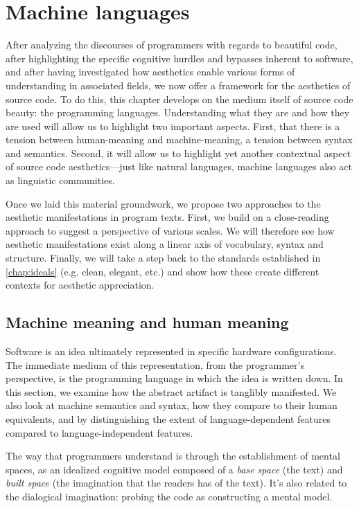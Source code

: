 \chapter{Machine languages}
\label{chap:programming}

After analyzing the discourses of programmers with regards to beautiful code, after highlighting the specific cognitive hurdles and bypasses inherent to software, and after having investigated how aesthetics enable various forms of understanding in associated fields, we now offer a framework for the aesthetics of source code. To do this, this chapter develops on the medium itself of source code beauty: the programming languages. Understanding what they are and how they are used will allow us to highlight two important aspects. First, that there is a tension between human-meaning and machine-meaning, a tension between syntax and semantics. Second, it will allow us to highlight yet another contextual aspect of source code aesthetics—just like natural languages, machine languages also act as linguistic communities.

Once we laid this material groundwork, we propose two approaches to the aesthetic manifestations in program texts. First, we build on a close-reading approach to suggest a perspective of various scales. We will therefore see how aesthetic manifestations exist along a linear axis of vocabulary, syntax and structure. Finally, we will take a step back to the standards established in \ref{chap:ideals} (e.g. clean, elegant, etc.) and show how these create different contexts for aesthetic appreciation.

\section{Machine meaning and human meaning}
\label{sec:human-machine-meaning}

Software is an idea ultimately represented in specific hardware configurations. The immediate medium of this representation, from the programmer's perspective, is the programming language in which the idea is written down. In this section, we examine how the abstract artifact is tanglibly manifested. We also look at machine semantics and syntax, how they compare to their human equivalents, and by distinguishing the extent of language-dependent features compared to language-independent features.

The way that programmers understand is through the establishment of mental spaces, as an idealized cognitive model composed of a \emph{base space} (the text) and \emph{built space} (the imagination that the readers has of the text). It's also related to the dialogical imagination: probing the code as constructing a mental model.

